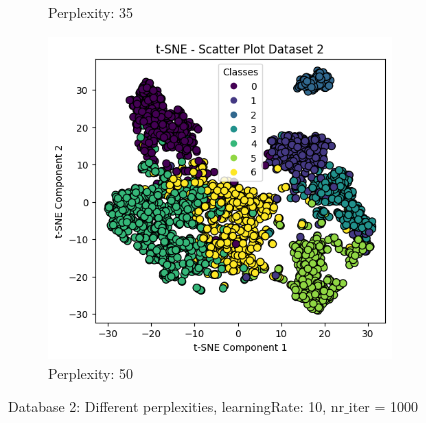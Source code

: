 \documentclass[12pt]{report}
\begin{document}
\begin{figure}[H]
\begin{subfigure}{.33\textwidth}
			\caption{Perplexity: 35}
			\label{Dataset2perplexity35}
		\end{subfigure}%
		\begin{subfigure}{.33\textwidth} %
			\centering
			\includegraphics[width=\linewidth]{../t-SNE/OutputPlot/Dataset2Outputplot/perplexity50.png}
			\caption{Perplexity: 50}
			\label{Dataset2perplexity50}
		\end{subfigure}
		\caption{Database 2: Different perplexities, learningRate: 10, nr$\_$iter = 1000}
		\label{Dataset2Diffnr_perplexity}
	\end{figure}
\end{document}
